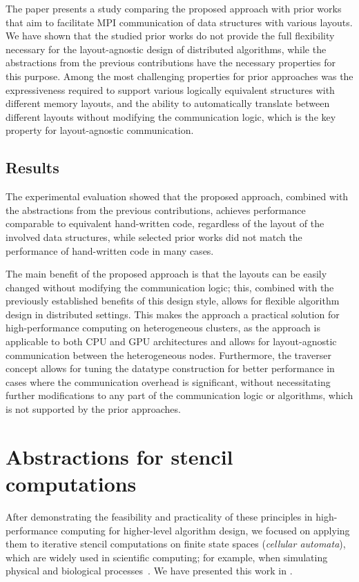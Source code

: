 The paper presents a study comparing the proposed approach with prior works that aim to facilitate MPI communication of data structures with various layouts. We have shown that the studied prior works do not provide the full flexibility necessary for the layout-agnostic design of distributed algorithms, while the abstractions from the previous contributions have the necessary properties for this purpose. Among the most challenging properties for prior approaches was the expressiveness required to support various logically equivalent structures with different memory layouts, and the ability to automatically translate between different layouts without modifying the communication logic, which is the key property for layout-agnostic communication.


\subsection{Results}\label{sec:layout-agnostic-results}

The experimental evaluation showed that the proposed approach, combined with the abstractions from the previous contributions, achieves performance comparable to equivalent hand-written code, regardless of the layout of the involved data structures, while selected prior works did not match the performance of hand-written code in many cases.

The main benefit of the proposed approach is that the layouts can be easily changed without modifying the communication logic; this, combined with the previously established benefits of this design style, allows for flexible algorithm design in distributed settings. This makes the approach a practical solution for high-performance computing on heterogeneous clusters, as the approach is applicable to both CPU and GPU architectures and allows for layout-agnostic communication between the heterogeneous nodes. Furthermore, the traverser concept allows for tuning the datatype construction for better performance in cases where the communication overhead is significant, without necessitating further modifications to any part of the communication logic or algorithms, which is not supported by the prior approaches.


\section{Abstractions for stencil computations}\label{sec:stencil-computations}

After demonstrating the feasibility and practicality of these principles in high-performance computing for higher-level algorithm design, we focused on applying them to iterative stencil computations on finite state spaces (\emph{cellular automata}), which are widely used in scientific computing; for example, when simulating physical and biological processes~\cite{mohebbi2020implementation,babu2021modeling,valentim2023cellular}. We have presented this work in .


